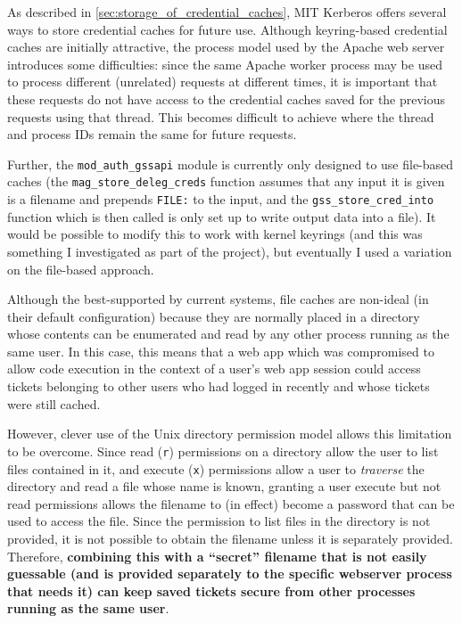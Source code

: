 \documentclass[12pt]{report}
\begin{document}
As described in \autoref{sec:storage_of_credential_caches}, MIT Kerberos offers several ways to store credential caches for future use. Although keyring-based credential caches are initially attractive, the process model used by the Apache web server introduces some difficulties: since the same Apache worker process may be used to process different (unrelated) requests at different times, it is important that these requests do not have access to the credential caches saved for the previous requests using that thread. This becomes difficult to achieve where the thread and process IDs remain the same for future requests.

Further, the \verb+mod_auth_gssapi+ module is currently only designed to use file-based caches (the \verb+mag_store_deleg_creds+ function assumes that any input it is given is a filename and prepends \texttt{FILE:} to the input, and the \verb+gss_store_cred_into+ function which is then called is only set up to write output data into a file). It would be possible to modify this to work with kernel keyrings (and this was something I investigated as part of the project), but eventually I used a variation on the file-based approach.

Although the best-supported by current systems, file caches are non-ideal (in their default configuration) because they are normally placed in a directory whose contents can be enumerated and read by any other process running as the same user. In this case, this means that a web app which was compromised to allow code execution in the context of a user's web app session could access tickets belonging to other users who had logged in recently and whose tickets were still cached.

However, clever use of the Unix directory permission model allows this limitation to be overcome. Since read (\texttt{r}) permissions on a directory allow the user to list files contained in it, and execute (\texttt{x}) permissions allow a user to \textit{traverse} the directory and read a file whose name is known, granting a user execute but not read permissions allows the filename to (in effect) become a password that can be used to access the file. Since the permission to list files in the directory is not provided, it is not possible to obtain the filename unless it is separately provided. Therefore, \textbf{combining this with a ``secret'' filename that is not easily guessable (and is provided separately to the specific webserver process that needs it) can keep saved tickets secure from other processes running as the same user}.
\end{document}
